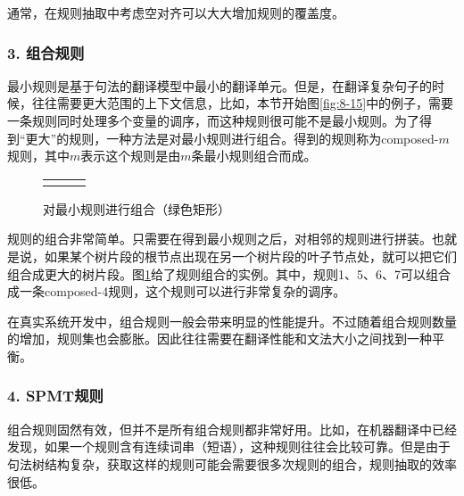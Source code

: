 \parinterval 通常，在规则抽取中考虑空对齐可以大大增加规则的覆盖度。


\subsubsection{3. 组合规则}

\parinterval 最小规则是基于句法的翻译模型中最小的翻译单元。但是，在翻译复杂句子的时候，往往需要更大范围的上下文信息，比如，本节开始图\ref{fig:8-15}中的例子，需要一条规则同时处理多个变量的调序，而这种规则很可能不是最小规则。为了得到“更大”的规则，一种方法是对最小规则进行组合。得到的规则称为composed-$m$规则，其中$m$表示这个规则是由$m$条最小规则组合而成。

\begin{figure}[htp]
\centering
\begin{tabular}{l l l}
& \subfigure{} &  \subfigure{}
\end{tabular}
\caption{对最小规则进行组合（绿色矩形）}
\label{fig:8-29}
\end{figure}

\parinterval 规则的组合非常简单。只需要在得到最小规则之后，对相邻的规则进行拼装。也就是说，如果某个树片段的根节点出现在另一个树片段的叶子节点处，就可以把它们组合成更大的树片段。图\ref{fig:8-29}给了规则组合的实例。其中，规则1、5、6、7可以组合成一条composed-4规则，这个规则可以进行非常复杂的调序。

\parinterval 在真实系统开发中，组合规则一般会带来明显的性能提升。不过随着组合规则数量的增加，规则集也会膨胀。因此往往需要在翻译性能和文法大小之间找到一种平衡。


\subsubsection{4. SPMT规则}

\parinterval 组合规则固然有效，但并不是所有组合规则都非常好用。比如，在机器翻译中已经发现，如果一个规则含有连续词串（短语），这种规则往往会比较可靠。但是由于句法树结构复杂，获取这样的规则可能会需要很多次规则的组合，规则抽取的效率很低。

